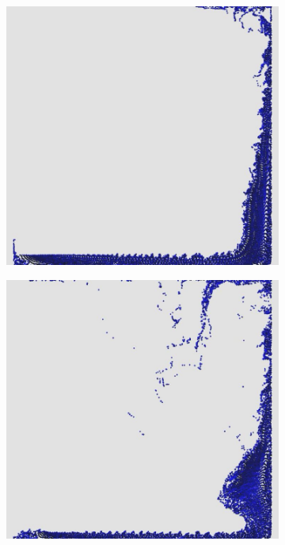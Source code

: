 \documentclass[12pt,a4paper,dvipsnames]{article}
\begin{document}
\begin{figure}[!ht]
\begin{subfigure}[!h]{0.3\textwidth}
	\end{subfigure}
	\begin{subfigure}[!h]{0.3\textwidth} \centering
		\includegraphics[width=\textwidth]{DB/DB-006.jpg}
	\end{subfigure}
	\begin{subfigure}[!h]{0.3\textwidth} \centering
		\includegraphics[width=\textwidth]{DB/DB-007.jpg}

\end{subfigure}
\end{figure}
\end{document}
